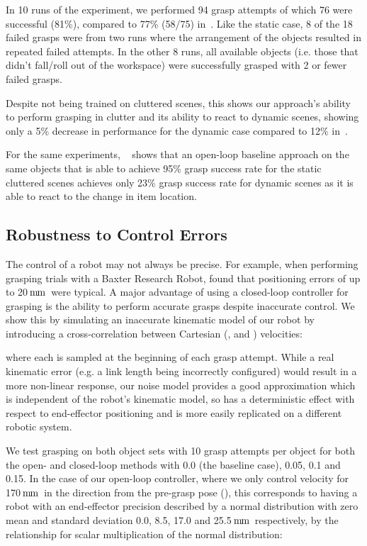 \documentclass[conference]{IEEEtran}
\newcommand{\pack}	{\hspace{-0.08em}}
\newcommand{\mm}	{\ensuremath{\rm\,m\pack m}}
\begin{document}
In 10 runs of the experiment, we performed 94 grasp attempts of which 76 were successful (81\%), compared to 77\% (58/75) in~\cite{Viereck2017LearningImages}.  Like the static case, 8 of the 18 failed grasps were from two runs where the arrangement of the objects resulted in repeated failed attempts.  In the other 8 runs, all available objects (i.e. those that didn't fall/roll out of the workspace) were successfully grasped with 2 or fewer failed grasps.  

Despite not being trained on cluttered scenes, this shows our approach's ability to perform grasping in clutter and its ability to react to dynamic scenes, showing only a 5\% decrease in performance for the dynamic case compared to 12\% in~\cite{Viereck2017LearningImages}.

For the same experiments, ~\cite{Viereck2017LearningImages} shows that an open-loop baseline approach on the same objects that is able to achieve 95\% grasp success rate for the static cluttered scenes achieves only 23\% grasp success rate for dynamic scenes as it is able to react to the change in item location. 





\subsection{Robustness to Control Errors}
\label{sec:controlerrors}

The control of a robot may not always be precise. For example, when performing grasping trials with a Baxter Research Robot, \citet{Lenz2015DeepGrasps} found that positioning errors of up to 20\mm~were typical.  A major advantage of using a closed-loop controller for grasping is the ability to perform accurate grasps despite inaccurate control.  We show this by simulating an inaccurate kinematic model of our robot by introducing a cross-correlation between Cartesian (,  and ) velocities:


where each  is sampled at the beginning of each grasp attempt.  While a real kinematic error (e.g. a link length being incorrectly configured) would result in a more non-linear response, our noise model provides a good approximation which is independent of the robot's kinematic model, so has a deterministic effect with respect to end-effector positioning and is more easily replicated on a different robotic system.  

We test grasping on both object sets with 10 grasp attempts per object for both the open- and closed-loop methods with  0.0 (the baseline case), 0.05, 0.1 and 0.15.  In the case of our open-loop controller, where we only control velocity for 170\mm~in the  direction from the pre-grasp pose (), this corresponds to having a robot with an end-effector precision described by a normal distribution with zero mean and standard deviation 0.0, 8.5, 17.0 and 25.5\mm~respectively, by the relationship for scalar multiplication of the normal distribution:
\end{document}
